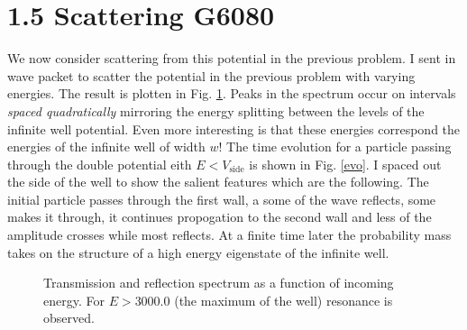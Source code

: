 \documentclass[singlepage,notitlepage,nofootinbib,11pt]{revtex4-1}
\begin{document}
\section*{1.5 Scattering G6080}
We now consider scattering from this potential in the previous problem. I sent in wave packet to scatter the potential in the previous problem with varying energies. The result is plotten in Fig. \ref{resonance}. Peaks in the spectrum occur on intervals {\it spaced quadratically} mirroring the energy splitting between the levels of the infinite well potential. Even more interesting is that these energies correspond the energies of the infinite well of width $w$! The time evolution for a particle passing through the double potential eith $E<V_{\text{side}}$ is shown in Fig. \ref{evo}. I spaced out the side of the well to show the salient features which are the following. The initial particle passes through the first wall, a some of the wave reflects, some makes it through, it continues propogation to the second wall and less of the amplitude crosses while most reflects. At a finite time later the probability mass takes on the structure of a high energy eigenstate of the infinite well.
\begin{figure}[h]
  \centering
  \captionsetup[subfigure]{labelformat=empty}
  \caption{\label{resonance} Transmission and reflection spectrum as a function of incoming energy. For $E>3000.0$ (the maximum of the well) resonance is observed.}
\end{figure}
\end{document}
